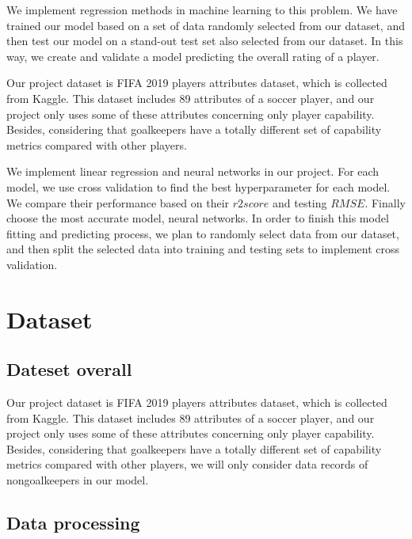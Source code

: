 \documentclass{article}
\begin{document}
We implement regression methods in machine learning to this problem.
We have trained our model based on a set of data randomly selected from our
dataset, and then test our model on a stand-out test set also selected from our
dataset. In this way, we create and validate a model predicting the overall
rating of a player.


Our project dataset is FIFA 2019 players attributes dataset, which is collected
from Kaggle. This dataset includes 89 attributes of a soccer player, and our
project only uses some of these attributes concerning only player capability.
Besides, considering that goalkeepers have a totally different set of capability
metrics compared with other players.

We implement linear regression and neural networks in our project. For each model, we use cross validation to find the
best hyperparameter for each model. We compare their performance based
on their $r2 score$ and testing $RMSE$. Finally choose the most accurate model, neural networks. In order to finish this model fitting and predicting process, we plan
to randomly select data from our dataset, and then split the selected data into
training and testing sets to implement cross validation.


\section*{Dataset}

\subsection{Dateset overall}

Our project dataset is FIFA 2019 players attributes dataset, which is collected
from Kaggle. This dataset includes 89 attributes of a soccer player, and our
project only uses some of these attributes concerning only player capability.
Besides, considering that goalkeepers have a totally different set of capability
metrics compared with other players, we will only consider data records of nongoalkeepers in our model.

\subsection{Data processing}
\end{document}
